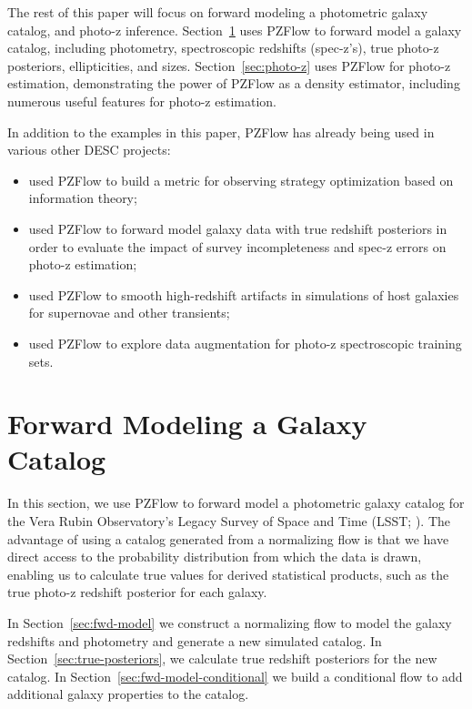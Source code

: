 \documentclass[twocolumn,twocolappendix]{aastex631}
\begin{document}
The rest of this paper will focus on forward modeling a photometric galaxy catalog, and photo-z inference.
Section~\ref{sec:galaxy-catalog} uses PZFlow to forward model a galaxy catalog, including photometry, spectroscopic redshifts (spec-z's), true photo-z posteriors, ellipticities, and sizes.
Section~\ref{sec:photo-z} uses PZFlow for photo-z estimation, demonstrating the power of PZFlow as a density estimator, including numerous useful features for photo-z estimation.

In addition to the examples in this paper, PZFlow has already being used in various other DESC projects:
\begin{itemize}
    \item \citet{malz2021} used PZFlow to build a metric for observing strategy optimization based on information theory;
    \item \citet{stylianou2022} used PZFlow to forward model galaxy data with true redshift posteriors in order to evaluate the impact of survey incompleteness and spec-z errors on photo-z estimation;
    \item \citet{lokken2022} used PZFlow to smooth high-redshift artifacts in simulations of host galaxies for supernovae and other transients;
    \item \citet{moskowitz2024} used PZFlow to explore data augmentation for photo-z spectroscopic training sets.
\end{itemize}


\section{Forward Modeling a Galaxy Catalog}
\label{sec:galaxy-catalog}

In this section, we use PZFlow to forward model a photometric galaxy catalog for the Vera Rubin Observatory's Legacy Survey of Space and Time (LSST; \citealt{ivezic2019}).
The advantage of using a catalog generated from a normalizing flow is that we have direct access to the probability distribution from which the data is drawn, enabling us to calculate true values for derived statistical products, such as the true photo-z redshift posterior for each galaxy.

In Section~\ref{sec:fwd-model} we construct a normalizing flow to model the galaxy redshifts and photometry and generate a new simulated catalog.
In Section~\ref{sec:true-posteriors}, we calculate true redshift posteriors for the new catalog.
In Section~\ref{sec:fwd-model-conditional} we build a conditional flow to add additional galaxy properties to the catalog.
\end{document}
